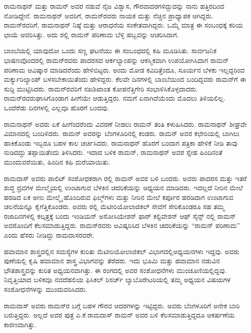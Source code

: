 ರಾಮನಾಥನ್ ಮತ್ತು ರಾಮನ್ ಅವರ ನಡುವೆ ನೈಜ ವಿಶ್ವಾಸ, ಗೌರವಾದರಗಳಿದ್ದುದನ್ನು ನಾನು ಹತ್ತಿರದಿಂದ ನೋಡಿದ್ದೇನೆ. ರಾಮನಾಥನ್ ಅವರಿಗೆ, ರಾಮನ್‍ರವರು ನಾಯಕ ಮತ್ತು ನೆಚ್ಚಿನ ಪ್ರಾಧ್ಯಾಪಕ ಆಗಿದ್ದರು. ರಾಮನ್‍ರವರಿಗೆ, ರಾಮನಾಥನ್ ನಿಷ್ಠೆ ಮತ್ತು ಆರಾಧನೆಯ ಸಂಕೇತವಾಗಿದ್ದರು. ಒಮ್ಮೆ ಮಾತ್ರ ಈ ಸಂಬಂಧಕ್ಕೆ ಕರಿಯ ಛಾಯೆ ಆವರಿಸಿತ್ತು. ಅದು ರಲ್ಲಿ ರಾಮನ್ ಪರಿಣಾಮ ಬೆಳ್ಳಿ ಹಬ್ಬವನ್ನು ಆಚರಿಸಿದಾಗ.

ಬಾಂಬೆಯಲ್ಲಿ ಯಾವುದೋ ಒಂದು ಸಣ್ಣ ಘಟನೆಯು ಈ ಸಂಬಂಧದಲ್ಲಿ ಕಹಿ ಮೂಡಿಸಿತು. ಸಾರ್ವಜನಿಕ ಭಾಷಣವೊಂದರಲ್ಲಿ ರಾಮನ್‍ರವರು ಪಾದರಸದ ಆರ್ಕಲ್ಯಾಂಪನ್ನು ಆಕಸ್ಮಿಕವಾಗಿ ಉಪಯೋಗಿಸಿದಾಗ ರಾಮನ್ ಪರಿಣಾಮ ಆವಿಷ್ಕಾರ ಮಾಡಿದರೆಂದು ಹೇಳಿಬಿಟ್ಟರು. ಅಂದು ಮೋಡ ಕವಿದಿತ್ತೆಂದೂ, ಸೂರ್ಯನ ಬೆಳಕು ಇಲ್ಲದ್ದರಿಂದ ಮರ್ಕ್ಯುರಿಲ್ಯಾಂಪ್ ಬಳಸಬೇಕಾಯಿತೆಂದು ಹೇಳಿದ್ದರು. ಕೆಲವೇ ದಿನಗಳಲ್ಲಿ ಬಾಂಬೆಯಿಂದ ಬಂದಿದ್ದವರು ರಾಮನ್‍ಗೆ ಈ ಸುದ್ದಿ ಮುಟ್ಟಿಸಿದರು. ರಾಮನ್‍ರವರಿಗೆ ನಖಶಿಖಾಂತ ಕೋಪನೆತ್ತಿಗೇರಿ ಸಂಭಾಳಿಸಿಕೊಳ್ಳದಾದರು. ರಾಮನ್‍ರವರು\break ಘಾಸಿಗೊಂಡಾಗ ಹೀಗೆಯೇ ಆಡುತ್ತಿದ್ದರು. ನಮಗೆ ಏನಾಗಿದೆಯೆಂದು ಮೊದಲು ತಿಳಿಯಲಿಲ್ಲ. ಒಂದೆರೆಡು ದಿನಗಳಲ್ಲಿ ಎಲ್ಲವೂ ಹೊರಗೆ ಬಂದವು.

ರಾಮನಾಥನ್ ಅವರು ಏಕೆ ಹೀಗೆಂದರೆಂದು ವಿವರಣೆ ನೀಡಲು ರಾಮನ್ ತಂತಿ ಕಳುಹಿಸಿದರು. ರಾಮನಾಥನ್ ಶೀಘ್ರವೇ ವಿಮಾನದಲ್ಲಿ ಬಂದಿಳಿದರು. ರಾಮನ್ ಅವರನ್ನು ಬೆಂಗಳೂರಿನಲ್ಲಿ ಕಂಡರು. ರಾಮನ್ ಅವರ ಕಛೇರಿಯಲ್ಲಿ ಬಾಗಿಲು ಹಾಕಿಕೊಂಡು ಇಬ್ಬರೂ ಬಹಳ ಕಾಲ ಚರ್ಚಿಸಿದರು. ರಾಮನಾಥನ್ ಹೊರಗೆ ಬಂದಾಗ ಪತ್ರಿಕಾ ಹೇಳಿಕೆ ನೀಡಿ ತಾವು ನುಡಿದದ್ದು ತಪ್ಪಾಯಿತೆಂದು ತಿಳಿಸಿದರು. ಇದಾದ ಬಳಿಕ ರಾಮನ್, ರಾಮನಾಥನ್ ಅವರ ಸ್ನೇಹ ಹಿಂದಿನಂತೆ ಮುಂದುವರೆಯಿತು, ಹಿಂದಿನ ಕಹಿ ಮರೆಯಾಯಿತು.



ರಾಮದಾಸ್ ಅವರು ಪಾಲಿಟ್ ಸಂಶೋಧಕರಾಗಿ ರಲ್ಲಿ ರಾಮನ್ ಅವರ ಬಳಿ ಬಂದರು. ಅವರು ಪಾದರಸ ಮತ್ತು ಇತರೆ ಶುದ್ಧ ದ್ರವಗಳ ಮೇಲ್ಮೈಯಲ್ಲಿ ಉಂಟಾಗುವ ಬೆಳಕಿನ ಚದರಿಕೆಯನ್ನು ಅಧ್ಯಯನ ಮಾಡಿದರು. ಇದಲ್ಲದೆ ನೀರಿನ ಮೇಲೆ ಹರಡಿದ ಏಕ ಅಣು ಮೇಲ್ಮೈ ಹೊಂದಿರುವ ಫಿಲ್ಮ್‌ಗಳು ಮತ್ತು ನೀರಿನ ಮೇಲೆ ಕರ್ಪೂರ ಹರಡಿದಾಗ ಉಂಟಾಗುವ ಚಲನೆಯನ್ನೂ ಕೈಗೆತ್ತಿಕೊಂಡರು. ಅವರು ರಲ್ಲಿ ಮೆಟೀರಿಯೋಲಾಜಿಕಲ್ ಸೇವೆಗೆ ಸೇರಿಕೊಂಡರೂ ಸಹ ತಮ್ಮ ರಜಾದಿನಗಳಲ್ಲಿ ಕಲ್ಕತ್ತಕ್ಕೆ ಬಂದು ಇಂಡಿಯನ್ ಅಸೋಸಿಯೇಶನ್ ಫಾರ್ ಕಲ್ಟಿವೇಶನ್ ಆಫ್ ಸೈನ್ಸ್ ನಲ್ಲಿ ರಾಮನ್ ಅವರೊಂದಿಗೆ ಕೆಲಸಮಾಡುತ್ತಿದ್ದರು. ರಾಮನ್‍ರವರು ಆವಿಷ್ಕರಿಸಿದ ಬೆಳಕಿನ ಚದರಿಕೆಯನ್ನು “ರಾಮನ್ ಪರಿಣಾಮ” ಎಂದು ಹೆಸರು ನೀಡಿದ್ದು ರಾಮದಾಸರವರೇ.

ಹವಾಮಾನ ಶಾಸ್ತ್ರದಲ್ಲಿನ ಸಮಸ್ಯೆಗಳ ಕುರಿತು ಮೆಟೀರಿಯೋಲಾಜಿಕಲ್ ವಿಭಾಗದಲ್ಲಿ\break ಅಧ್ಯಯನಗಳು ಇದ್ದವು. ಅವರು ಪುಣೆಯಲ್ಲಿ ಕೃಷಿ ಹವಾಮಾನ ಶಾಸ್ತ್ರ ವಿಭಾಗವನ್ನು ತೆರೆದರು. ಇದು ಭೂಮಿ ಮತ್ತು ಹವಾಮಾನ ನಡುವಿನ ಭೌತಶಾಸ್ತ್ರವನ್ನು ಕುರಿತ ಅಧ್ಯಯನವಾಗಿತ್ತು. ಈ ರಂಗದಲ್ಲಿ ಅವರ ಸಂಶೋಧನೆಗಳು ಮುಂಚೂಣಿಯಲ್ಲಿದ್ದವು. ನಿವೃತ್ತಿಯಾದ ಬಳಿಕವೂ ನವದೆಹಲಿಯ ಫಿಸಿಕಲ್ ರಿಸರ್ಚ್ ಲ್ಯಾಬೊರೇಟರಿಯಲ್ಲಿ ತಮ್ಮ ಅಧ್ಯಯನ ವಿಷಯಗಳ ಸಂಶೋಧನೆಗಳನ್ನು ಮುಂದುವರಿಸಿದರು.

ರಾಮದಾಸ್ ಅವರು ರಾಮನ್‍ರ ಬಗ್ಗೆ ಬಹಳ ಗೌರವ ಆದರಗಳನ್ನು ಇಟ್ಟಿದ್ದರು. ಅವರು ಬೆಂಗಳೂರಿಗೆ ಅನೇಕ ಬಾರಿ ಬರುತ್ತಿದ್ದರು. ಅಲ್ಲದೆ ಅವರ ಪುತ್ರ ಎ.ಕೆ.ರಾಮದಾಸ್ ರಾಮನ್ ಅವರ ಬಳಿ ಕೆಲಸಮಾಡುತ್ತಿದ್ದದೂ ಆಕರ್ಷಣೆಯ ಕಾರಣವಾಗಿತ್ತು.

